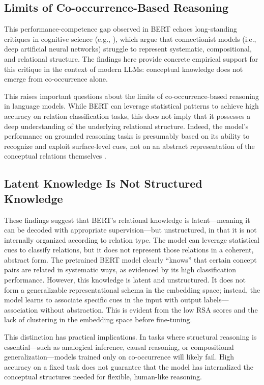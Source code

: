 \documentclass[stu,floatsintext]{apa7}
\begin{document}
\subsection{Limits of Co-occurrence-Based Reasoning}

This performance-competence gap observed in BERT echoes long-standing critiques in cognitive science (e.g., \cite{Fodor1988}), which argue that connectionist models (i.e., deep artificial neural networks) struggle to represent systematic, compositional, and relational structure. The findings here provide concrete empirical support for this critique in the context of modern LLMs: conceptual knowledge does not emerge from co-occurrence alone.

This raises important questions about the limits of co-occurrence-based reasoning in language models. While BERT can leverage statistical patterns to achieve high accuracy on relation classification tasks, this does not imply that it possesses a deep understanding of the underlying relational structure. Indeed, the model's performance on grounded reasoning tasks is presumably based on its ability to recognize and exploit surface-level cues, not on an abstract representation of the conceptual relations themselves \parencite{Bender2020, McCoy2019, Niven2019}.

\subsection{Latent Knowledge Is Not Structured Knowledge}

These findings suggest that BERT's relational knowledge is latent—meaning it can be decoded with appropriate supervision—but unstructured, in that it is not internally organized according to relation type. The model can leverage statistical cues to classify relations, but it does not represent those relations in a coherent, abstract form. The pretrained BERT model clearly ``knows'' that certain concept pairs are related in systematic ways, as evidenced by its high classification performance. However, this knowledge is latent and unstructured. It does not form a generalizable representational schema in the embedding space; instead, the model learns to associate specific cues in the input with output labels—association without abstraction. This is evident from the low RSA scores and the lack of clustering in the embedding space before fine-tuning.

This distinction has practical implications. In tasks where structural reasoning is essential—such as analogical inference, causal reasoning, or compositional generalization—models trained only on co-occurrence will likely fail. High accuracy on a fixed task does not guarantee that the model has internalized the conceptual structures needed for flexible, human-like reasoning.
\end{document}

